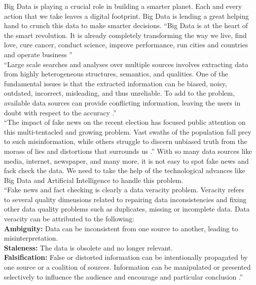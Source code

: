\documentclass[sigconf]{acmart}
\begin{document}
Big Data is playing a crucial role in building a smarter planet. Each and every action that we take leaves a digital footprint. Big Data is lending a great helping hand to crunch this data to make smarter decisions. ``Big Data is at the heart of the smart revolution. It is already completely transforming the way we live, find love, cure cancer, conduct science, improve performance, run cities and countries and operate business \cite{Marr2015}''  \\
``Large scale searches and analyses over multiple sources involves extracting data from highly heterogeneous structures, semantics, and qualities. One of the fundamental issues is that the extracted information can be biased, noisy, outdated, incorrect, misleading, and thus unreliable. To add to the problem, available data sources can provide conflicting information, leaving the users in doubt with respect to the accuracy \cite{Berti-Equille2016}.''  \\
``The impact of fake news on the recent election has focused public attention on this multi-tentacled and growing problem. Vast swaths of the population fall prey to such misinformation, while others struggle to discern unbiased truth from the morass of lies and distortions that surrounds us \cite{www-forbes2}.'' With so many data sources like media, internet, newspaper, and many more, it is not easy to spot fake news and fack check the data. We need to take the help of the technological advances like Big Data and Artificial Intelligence to handle this problem.\\ 
``Fake news and fact checking is clearly a data veracity problem. Veracity refers to several quality dimensions related to repairing data inconsistencies and fixing other data quality problems such as duplicates, missing or incomplete data. Data veracity can be attributed to the following: \\
\textbf{Ambiguity:} Data can be inconsistent from one source to another, leading to misinterpretation. \\
\textbf{Staleness:} The data is obsolete and no longer relevant. \\
\textbf{Falsification:} False or distorted information can be intentionally propagated by one source or a coalition of sources. Information can be manipulated or presented selectively to influence the audience and encourage and particular conclusion \cite{Berti-Equille2016}.'' 
\end{document}
